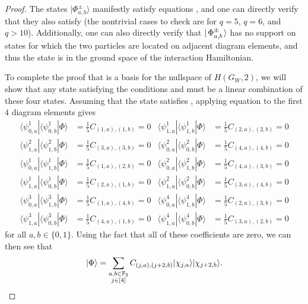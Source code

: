 \documentclass[../thesis-main/thesis-main]{subfiles}
\begin{document}
\begin{proof}
The states $|\Phi_{a,b}^{\pm}\rangle$ manifestly satisfy equations , and one can directly verify that they also satisfy  (the nontrivial cases to check are for $q=5$, $q=6$, and $q>10$).  Additionally, one can also directly verify that $|\mspace{2mu} \Phi_{a,b}^{\pm} \mspace{2mu} \rangle$ has no support on states for which the two particles are located on adjacent diagram elements, and thus the state is in the ground space of the interaction Hamiltonian.

To complete the proof that  is a basis for the nullspace of $H(G_W,2)$, we will show that any state satisfying the conditions  and  must be a linear combination of these four states.  Assuming that the state satisfies , applying equation  to the first $4$ diagram elements gives
\begin{align}
\langle\psi_{0,a}^{1}|\langle\psi_{0,b}^{1}|\Phi\rangle & =\frac{1}{5} C_{(1,a),(1,b)}=0 &
\langle\psi_{1,a}^{1}|\langle\psi_{1,b}^{1}|\Phi\rangle & =\frac{1}{5} C_{(2,a),(2,b)}=0\\
\langle\psi_{1,a}^{2}|\langle\psi_{1,b}^{2}|\Phi\rangle & =\frac{1}{5} C_{(3,a),(3,b)}=0 &
\langle\psi_{0,a}^{2}|\langle\psi_{0,b}^{2}|\Phi\rangle & =\frac{1}{5} C_{(4,a),(4,b)}=0\\
\langle\psi_{0,a}^{1}|\langle\psi_{1,b}^{1}|\Phi\rangle & =\frac{1}{5} C_{(1,a),(2,b)}=0 &
\langle\psi_{0,a}^{2}|\langle\psi_{1,b}^{2}|\Phi\rangle & =\frac{1}{5} C_{(4,a),(3,b)}=0\\
\langle\psi_{1,a}^{1}|\langle\psi_{0,b}^{1}|\Phi\rangle & =\frac{1}{5} C_{(2,a),(1,b)}=0 &
\langle\psi_{1,a}^{2}|\langle\psi_{0,b}^{2}|\Phi\rangle & =\frac{1}{5} C_{(3,a),(4,b)}=0\\
\langle\psi_{0,a}^{3}|\langle\psi_{1,b}^{3}|\Phi\rangle & =\frac{1}{5} C_{(1,a),(4,b)}=0 &
\langle\psi_{0,a}^{4}|\langle\psi_{1,b}^{4}|\Phi\rangle & =\frac{1}{5} C_{(2,a),(3,b)}=0\\
\langle\psi_{1,a}^{3}|\langle\psi_{0,b}^{3}|\Phi\rangle & =\frac{1}{5} C_{(4,a),(1,b)}=0 &
\langle\psi_{1,a}^{4}|\langle\psi_{0,b}^{4}|\Phi\rangle & =\frac{1}{5} C_{(3,a),(2,b)}=0
\end{align}
for all $a,b\in \{0,1\}$. Using the fact that all of these coefficients are zero, we can then see that
\begin{align}
|\Phi\rangle=\sum_{\substack{a,b\in\FF_2\\ j\in [4]}}C_{(j,a),(j+2,b)}|\chi_{j,a}\rangle|\chi_{j+2,b}\rangle.

\end{align}
\end{proof}
\end{document}
